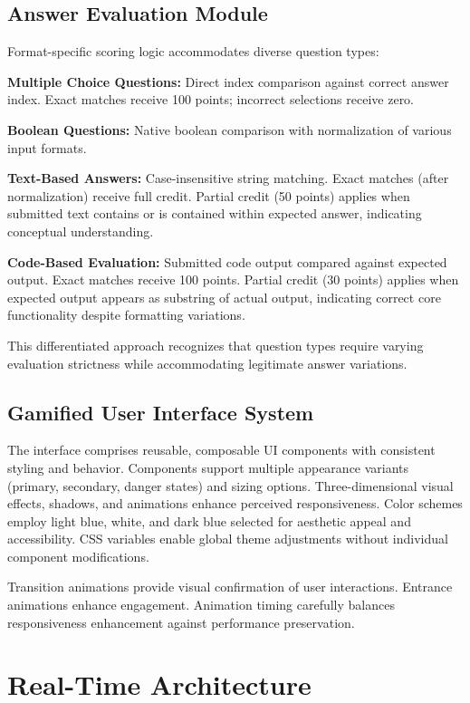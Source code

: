 \documentclass[12pt,a4paper]{report}
\begin{document}
\subsection{Answer Evaluation Module}

Format-specific scoring logic accommodates diverse question types:

\textbf{Multiple Choice Questions:} Direct index comparison against correct answer index. Exact matches receive 100 points; incorrect selections receive zero.

\textbf{Boolean Questions:} Native boolean comparison with normalization of various input formats.

\textbf{Text-Based Answers:} Case-insensitive string matching. Exact matches (after normalization) receive full credit. Partial credit (50 points) applies when submitted text contains or is contained within expected answer, indicating conceptual understanding.

\textbf{Code-Based Evaluation:} Submitted code output compared against expected output. Exact matches receive 100 points. Partial credit (30 points) applies when expected output appears as substring of actual output, indicating correct core functionality despite formatting variations.

This differentiated approach recognizes that question types require varying evaluation strictness while accommodating legitimate answer variations.

\subsection{Gamified User Interface System}

The interface comprises reusable, composable UI components with consistent styling and behavior. Components support multiple appearance variants (primary, secondary, danger states) and sizing options. Three-dimensional visual effects, shadows, and animations enhance perceived responsiveness. Color schemes employ light blue, white, and dark blue selected for aesthetic appeal and accessibility. CSS variables enable global theme adjustments without individual component modifications.

Transition animations provide visual confirmation of user interactions. Entrance animations enhance engagement. Animation timing carefully balances responsiveness enhancement against performance preservation.

\section{Real-Time Architecture}
\end{document}
